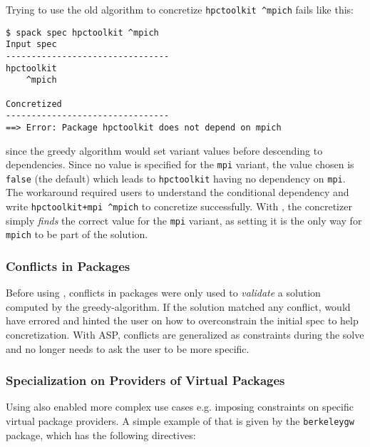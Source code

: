 Trying to use the old algorithm to concretize {\tt hpctoolkit \^{}mpich} fails like this:

\begin{verbatim}
$ spack spec hpctoolkit ^mpich
Input spec
--------------------------------
hpctoolkit
    ^mpich

Concretized
--------------------------------
==> Error: Package hpctoolkit does not depend on mpich
\end{verbatim}
%
since the greedy algorithm would set variant values before descending to dependencies.
Since no value is specified for the {\tt mpi} variant, the value chosen is
{\tt false} (the default) which leads to {\tt hpctoolkit} having no dependency on
{\tt mpi}. The workaround required users to understand the conditional dependency and
write {\tt hpctoolkit+mpi \^{}mpich} to concretize successfully. With \clingo{}, the
concretizer simply {\it finds} the correct value for the {\tt mpi} variant, as
setting it is the only way for {\tt mpich} to be part of the solution.



\subsubsection{Conflicts in Packages}
Before using \clingo{}, conflicts in packages were only used to \emph{validate} a
solution computed by the greedy-algorithm. If the solution matched any conflict,
\spack{} would have errored and hinted the user on how to overconstrain the initial spec
to help concretization. With ASP, conflicts are generalized as constraints during the
solve\footnotemark{} and \spack{} no longer needs to ask the user to be more specific.

\subsubsection{Specialization on Providers of Virtual Packages}
Using \clingo{} also enabled more complex use cases e.g. imposing constraints on
specific virtual package providers. A simple example of that is given by the
{\tt berkeleygw} package, which has the following directives:


